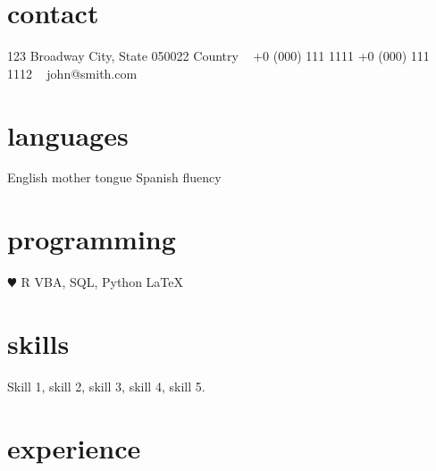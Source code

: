 \documentclass[]{cv-style}          %
\begin{document}
\lastupdated


\begin{aside}
%
\section{contact}
123 Broadway
City, State 050022
Country
~
+0 (000) 111 1111
+0 (000) 111 1112
~
john@smith.com
%
\section{languages}
English mother tongue
Spanish fluency
%
\section{programming}
{\color{red} $\varheartsuit$} R
VBA, SQL, Python
\LaTeX{}
%
\end{aside}


\section{skills}
  \vspace{-0.2cm}

Skill 1, skill 2, skill 3, skill 4, skill 5.


\section{experience}
\end{document}
